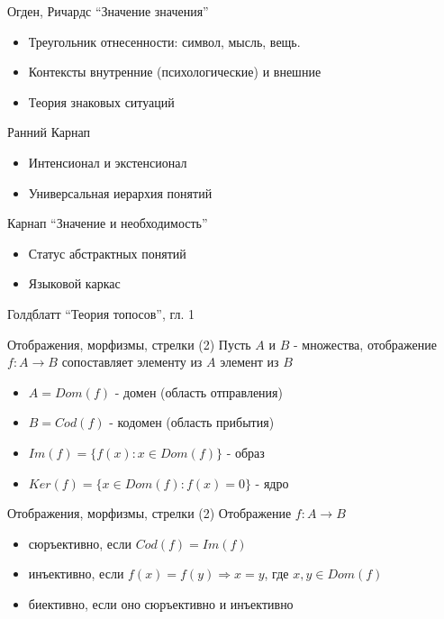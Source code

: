 \documentclass{beamer}
\begin{document}
\begin{frame}{Огден, Ричардс ``Значение значения''}
  \begin{itemize}
    \item Треугольник отнесенности: символ, мысль, вещь.
    \item Контексты внутренние (психологические) и внешние
    \item Теория знаковых ситуаций
  \end{itemize}
\end{frame}

\begin{frame}{Ранний Карнап}
  \begin{itemize}
    \item Интенсионал и экстенсионал
    \item Универсальная иерархия понятий
  \end{itemize}
\end{frame}

\begin{frame}{Карнап ``Значение и необходимость''}
  \begin{itemize}
    \item Статус абстрактных понятий
    \item Языковой каркас
  \end{itemize}
\end{frame}

\begin{frame}{Голдблатт ``Теория топосов'', гл. 1}
\end{frame}

\begin{frame}{Отображения, морфизмы, стрелки (2)}
Пусть $A$ и $B$ - множества, отображение $f : A \to B$ сопоставляет элементу из $A$ элемент из $B$\\
  \begin{itemize}
    \item $A = Dom(f)$ - домен (область отправления)
    \item $B = Cod(f)$ - кодомен (область прибытия) 
    \item $Im(f) = \{f(x) : x \in Dom(f)\}$ - образ 
    \item $Ker(f) = \{x \in Dom(f) : f(x) = 0\}$ - ядро 
  \end{itemize}
\end{frame}

\begin{frame}{Отображения, морфизмы, стрелки (2)}
Отображение $f : A \to B$
  \begin{itemize}
    \item сюръективно, если $Cod(f) = Im(f)$
    \item инъективно, если $f(x) = f(y) \Rightarrow x = y$, где $x, y \in Dom(f)$
    \item биективно, если оно сюръективно и инъективно
  \end{itemize}
\end{frame}
\end{document}

